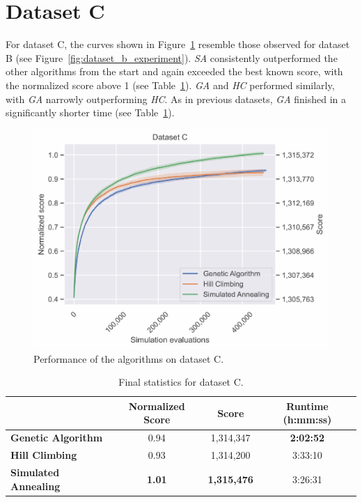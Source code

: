 \newpage
\section{Dataset C} \label{sec:dataset_c}

For dataset C, the curves shown in Figure~\ref{fig:dataset_c_experiment} resemble those observed for dataset B (see Figure~\ref{fig:dataset_b_experiment}). \textit{SA} consistently outperformed the other algorithms from the start and again exceeded the best known score, with the normalized score above 1 (see Table~\ref{tab:dataset_c_results}). \textit{GA} and \textit{HC} performed similarly, with \textit{GA} narrowly outperforming \textit{HC}. As in previous datasets, \textit{GA} finished in a significantly shorter time (see Table~\ref{tab:dataset_c_results}).

\bigskip

\begin{figure}[h]
    \centering
    \includegraphics[width=\linewidth]{img/experiments/pdfa-c_Genetic_Algorithm_Hill_Climbing_Simulated_Annealing.pdf}
    \caption[Performance of the algorithms on dataset C]{
        Performance of the algorithms on dataset C.
    }
    \label{fig:dataset_c_experiment}
\end{figure}

\bigskip

\begin{table}[h]
\centering\footnotesize\sf
\begin{tabular}{lccc}
\toprule
& Normalized Score & Score & Runtime (h:mm:ss) \\
\midrule
\textcolor{myblue}{\textbf{Genetic Algorithm}} & 0.94 & 1,314,347 & \textbf{2:02:52} \\
\textcolor{myorange}{\textbf{Hill Climbing}} & 0.93 & 1,314,200 & 3:33:10 \\
\textcolor{mygreen}{\textbf{Simulated Annealing}} & \textbf{1.01} & \textbf{1,315,476} & 3:26:31 \\
\bottomrule
\end{tabular}
\caption[Statistics for dataset C]{
    Final statistics for dataset C.
}
\label{tab:dataset_c_results}
\end{table}

